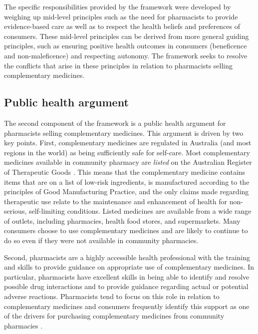 \documentclass[11pt,a4paper]{article}
\begin{document}
The specific responsibilities provided by the framework were developed
by weighing up mid-level principles such as the need for pharmacists to
provide evidence-based care as well as to respect the health beliefs and
preferences of consumers. These mid-level principles can be derived from
more general guiding principles, such as ensuring positive health
outcomes in consumers (beneficence and non-maleficence) and respecting
autonomy. The framework seeks to resolve the conflicts that arise in
these principles in relation to pharmacists selling complementary
medicines.

\subsection{Public health argument}\label{public-health-argument}

The second component of the framework is a public health argument for
pharmacists selling complementary medicines. This argument is driven by
two key points. First, complementary medicines are regulated in
Australia (and most regions in the world) as being sufficiently safe for
self-care. Most complementary medicines available in community pharmacy
are \emph{listed} on the Australian Register of Therapeutic Goods
\autocite{TGA2019_listed}. This means that the complementary medicine
contains items that are on a list of low-risk ingredients, is
manufactured according to the principles of Good Manufacturing Practice,
and the only claims made regarding therapeutic use relate to the
maintenance and enhancement of health for non-serious, self-limiting
conditions. Listed medicines are available from a wide range of outlets,
including pharmacies, health food stores, and supermarkets. Many
consumers choose to use complementary medicines and are likely to
continue to do so even if they were not available in community
pharmacies.

Second, pharmacists are a highly accessible health professional with the
training and skills to provide guidance on appropriate use of
complementary medicines. In particular, pharmacists have excellent
skills in being able to identify and resolve possible drug interactions
and to provide guidance regarding actual or potential adverse reactions.
Pharmacists tend to focus on this role in relation to complementary
medicines and consumers frequently identify this support as one of the
drivers for purchasing complementary medicines from community pharmacies
\autocites{Olatunde2010}{Kanjanarach2011}.
\end{document}
